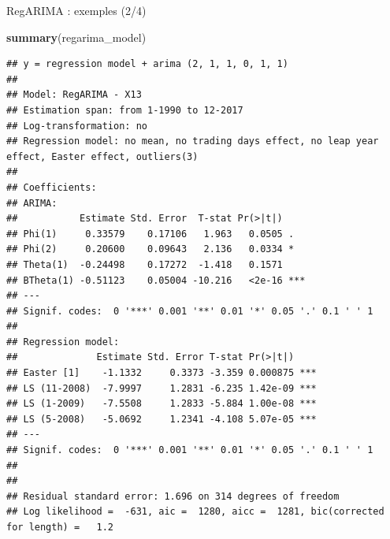 \documentclass[10pt,xcolor=table,color={dvipsnames,usenames},ignorenonframetext,usepdftitle=false,french]{beamer}
\newenvironment{Shaded}{\begin{snugshade}}{\end{snugshade}}
\newcommand{\KeywordTok}[1]{\textcolor[rgb]{0.13,0.29,0.53}{\textbf{#1}}}
\newcommand{\NormalTok}[1]{#1}
\begin{document}
\begin{frame}[fragile]{RegARIMA : exemples (2/4)}
\protect\hypertarget{regarima-exemples-24}{}

\footnotesize

\begin{Shaded}
\begin{Highlighting}[]
\KeywordTok{summary}\NormalTok{(regarima_model)}
\end{Highlighting}
\end{Shaded}

\begin{verbatim}
## y = regression model + arima (2, 1, 1, 0, 1, 1)
## 
## Model: RegARIMA - X13
## Estimation span: from 1-1990 to 12-2017
## Log-transformation: no
## Regression model: no mean, no trading days effect, no leap year effect, Easter effect, outliers(3)
## 
## Coefficients:
## ARIMA: 
##           Estimate Std. Error  T-stat Pr(>|t|)    
## Phi(1)     0.33579    0.17106   1.963   0.0505 .  
## Phi(2)     0.20600    0.09643   2.136   0.0334 *  
## Theta(1)  -0.24498    0.17272  -1.418   0.1571    
## BTheta(1) -0.51123    0.05004 -10.216   <2e-16 ***
## ---
## Signif. codes:  0 '***' 0.001 '**' 0.01 '*' 0.05 '.' 0.1 ' ' 1
## 
## Regression model: 
##              Estimate Std. Error T-stat Pr(>|t|)    
## Easter [1]    -1.1332     0.3373 -3.359 0.000875 ***
## LS (11-2008)  -7.9997     1.2831 -6.235 1.42e-09 ***
## LS (1-2009)   -7.5508     1.2833 -5.884 1.00e-08 ***
## LS (5-2008)   -5.0692     1.2341 -4.108 5.07e-05 ***
## ---
## Signif. codes:  0 '***' 0.001 '**' 0.01 '*' 0.05 '.' 0.1 ' ' 1
## 
## 
## Residual standard error: 1.696 on 314 degrees of freedom
## Log likelihood =  -631, aic =  1280, aicc =  1281, bic(corrected for length) =   1.2
\end{verbatim}

\end{frame}
\end{document}
